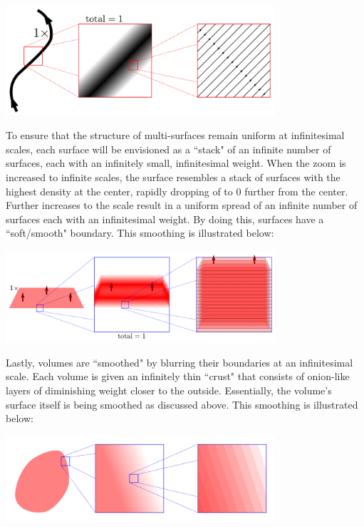 \documentclass{book}
\begin{document}
\begin{center}
\includegraphics[width = 0.75\textwidth]{Smoothness_and_duality/path_smoothing}
\end{center}

To ensure that the structure of multi-surfaces remain uniform at infinitesimal scales, each surface will be envisioned as a ``stack" of an infinite number of surfaces, each with an infinitely small, infinitesimal weight. When the zoom is increased to infinite scales, the surface resembles a stack of surfaces with the highest density at the center, rapidly dropping of to \(0\) further from the center. Further increases to the scale result in a uniform spread of an infinite number of surfaces each with an infinitesimal weight. By doing this, surfaces have a ``soft/smooth" boundary. This smoothing is illustrated below:

\begin{center}
\includegraphics[width = 0.75\textwidth]{Smoothness_and_duality/surface_smoothing}
\end{center}

Lastly, volumes are ``smoothed" by blurring their boundaries at an infinitesimal scale. Each volume is given an infinitely thin ``crust" that consists of onion-like layers of diminishing weight closer to the outside. Essentially, the volume's surface itself is being smoothed as discussed above. This smoothing is illustrated below:

\begin{center}
\includegraphics[width = 0.75\textwidth]{Smoothness_and_duality/volume_smoothing}
\end{center}
\end{document}
